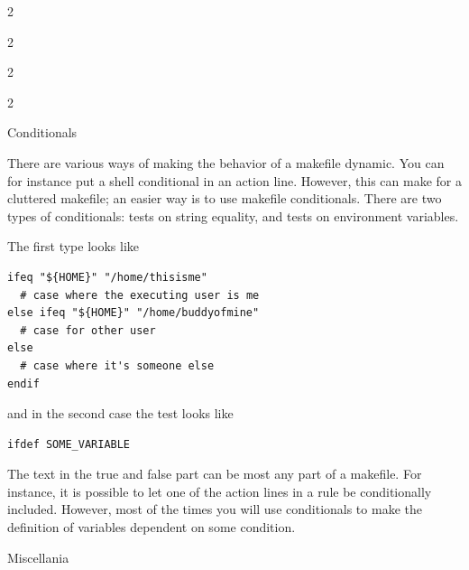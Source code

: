 \begin{multicols}{2}
  
  \columnbreak
  
\end{multicols}
\begin{multicols}{2}
  
  \columnbreak
  
\end{multicols}
\begin{multicols}{2}
  
  \columnbreak
  
\end{multicols}
\begin{multicols}{2}
  
  \columnbreak
  
\end{multicols}

 {Conditionals}

There are various ways of making the behavior of a makefile dynamic.
You can for instance put a shell conditional in an action line.
However, this can make for a cluttered makefile; an easier way is to use
makefile conditionals. There are two types of conditionals: tests on string
equality, and tests on environment variables.

The first type looks like
\begin{lstlisting}
ifeq "${HOME}" "/home/thisisme"
  # case where the executing user is me
else ifeq "${HOME}" "/home/buddyofmine"
  # case for other user 
else
  # case where it's someone else
endif
\end{lstlisting}
and in the second case the test looks like
\begin{lstlisting}
ifdef SOME_VARIABLE
\end{lstlisting}
The text in the true and false part can be most any part of a
makefile. For instance, it is possible to let one of the action lines
in a rule be conditionally included. However, most of the times you
will use conditionals to make the definition of variables dependent on
some condition.


 {Miscellania}

